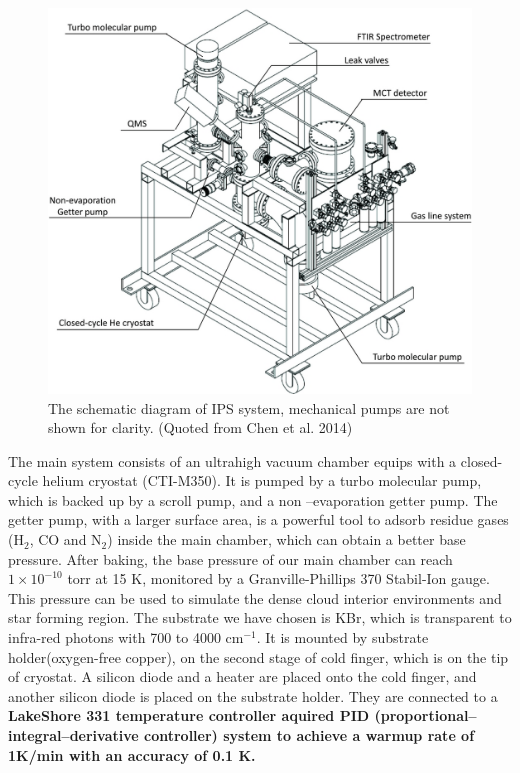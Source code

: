 \begin{figure}
\centering
\includegraphics[width=\textwidth]{figures/chapter2/system.jpg}
\caption{The schematic diagram of IPS system, mechanical pumps are not shown for clarity. (Quoted from Chen et al. 2014)}
\label{fig:system}
\end{figure}

The main system consists of an ultrahigh vacuum chamber equips with a closed-cycle helium cryostat (CTI-M350). It is pumped by a turbo molecular pump, which is backed up by a scroll pump, and a non –evaporation getter pump. The getter pump, with a larger surface area, is a powerful tool to adsorb residue gases (H$_2$, CO and N$_2$) inside the main chamber, which can obtain a better base pressure. After baking, the base pressure of our main chamber can reach $1 \times 10^{-10}$ torr at 15 K, monitored by a Granville-Phillips 370 Stabil-Ion gauge. This pressure can be used to simulate the dense cloud interior environments and star forming region. The substrate we have chosen is KBr, which is transparent to infra-red photons with 700 to 4000 cm$^{-1}$. It is mounted by substrate holder(oxygen-free copper), on the second stage of cold finger, which is on the tip of cryostat. A silicon diode and a heater are placed onto the cold finger, and another silicon diode is placed on the substrate holder. They are connected to a \textbf{LakeShore 331 temperature controller aquired PID (proportional–integral–derivative controller) system to achieve a warmup rate of 1K/min with an accuracy of 0.1 K.}


